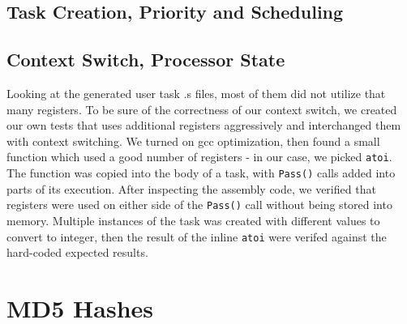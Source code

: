 \documentclass[12pt]{article}
\begin{document}
\subsection{Task Creation, Priority and Scheduling}
\subsection{Context Switch, Processor State}
Looking at the generated user task .s files, most of them did not utilize that many registers. To be sure of the correctness of our context switch, we created our own tests that uses additional registers aggressively and interchanged them with context switching. We turned on gcc optimization, then found a small function which used a good number of registers - in our case, we picked \texttt{atoi}. The function was copied into the body of a task, with \texttt{Pass()} calls added into parts of its execution. After inspecting the assembly code, we verified that registers were used on either side of the \texttt{Pass()} call without being stored into memory. Multiple instances of the task was created with different values to convert to integer, then the result of the inline \texttt{atoi} were verifed against the hard-coded expected results.
\section{MD5 Hashes}
\end{document}
